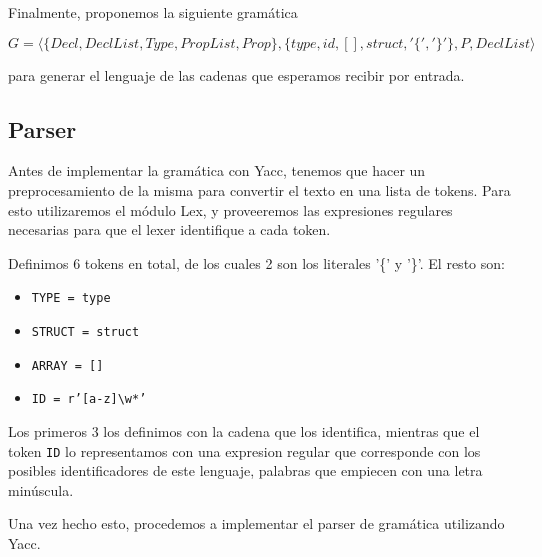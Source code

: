 Finalmente, proponemos la siguiente gramática

\[
G = \langle\{Decl, DeclList, Type, PropList, Prop\}, \{type, id, [], struct, '\{', '\}'\}, P, DeclList\rangle
\]

para generar el lenguaje de las cadenas que esperamos recibir por entrada.

\subsection{Parser}

Antes de implementar la gramática con Yacc, tenemos que hacer un preprocesamiento de la misma para convertir el texto en una lista de tokens. Para esto utilizaremos el módulo Lex, y proveeremos las expresiones regulares necesarias para que el lexer identifique a cada token.

Definimos 6 tokens en total, de los cuales 2 son los literales '\{' y '\}'. El resto son:

\begin{itemize}
    \item \texttt{TYPE = type}
    \item \texttt{STRUCT = struct} 
    \item \texttt{ARRAY = []} 
    \item \texttt{ID = r'[a-z]\textbackslash w*'}
\end{itemize}

Los primeros 3 los definimos con la cadena que los identifica, mientras que el token \texttt{ID} lo representamos con una expresion regular que corresponde con los posibles identificadores de este lenguaje, palabras que empiecen con una letra minúscula.

Una vez hecho esto, procedemos a implementar el parser de gramática utilizando Yacc.
